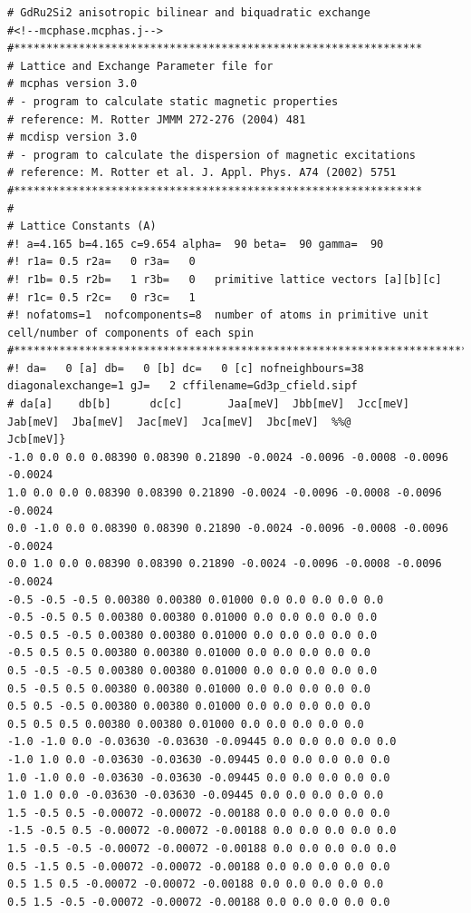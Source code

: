 {\footnotesize
\begin{verbatim}
# GdRu2Si2 anisotropic bilinear and biquadratic exchange 
#<!--mcphase.mcphas.j-->
#***************************************************************
# Lattice and Exchange Parameter file for
# mcphas version 3.0
# - program to calculate static magnetic properties
# reference: M. Rotter JMMM 272-276 (2004) 481
# mcdisp version 3.0
# - program to calculate the dispersion of magnetic excitations
# reference: M. Rotter et al. J. Appl. Phys. A74 (2002) 5751
#***************************************************************
#
# Lattice Constants (A)
#! a=4.165 b=4.165 c=9.654 alpha=  90 beta=  90 gamma=  90
#! r1a= 0.5 r2a=   0 r3a=   0
#! r1b= 0.5 r2b=   1 r3b=   0   primitive lattice vectors [a][b][c]
#! r1c= 0.5 r2c=   0 r3c=   1
#! nofatoms=1  nofcomponents=8  number of atoms in primitive unit cell/number of components of each spin
#****************************************************************************}
#! da=   0 [a] db=   0 [b] dc=   0 [c] nofneighbours=38 diagonalexchange=1 gJ=   2 cffilename=Gd3p_cfield.sipf
# da[a]    db[b]      dc[c]       Jaa[meV]  Jbb[meV]  Jcc[meV]  Jab[meV]  Jba[meV]  Jac[meV]  Jca[meV]  Jbc[meV]  %%@
Jcb[meV]} 
-1.0 0.0 0.0 0.08390 0.08390 0.21890 -0.0024 -0.0096 -0.0008 -0.0096 -0.0024 
1.0 0.0 0.0 0.08390 0.08390 0.21890 -0.0024 -0.0096 -0.0008 -0.0096 -0.0024 
0.0 -1.0 0.0 0.08390 0.08390 0.21890 -0.0024 -0.0096 -0.0008 -0.0096 -0.0024 
0.0 1.0 0.0 0.08390 0.08390 0.21890 -0.0024 -0.0096 -0.0008 -0.0096 -0.0024 
-0.5 -0.5 -0.5 0.00380 0.00380 0.01000 0.0 0.0 0.0 0.0 0.0 
-0.5 -0.5 0.5 0.00380 0.00380 0.01000 0.0 0.0 0.0 0.0 0.0 
-0.5 0.5 -0.5 0.00380 0.00380 0.01000 0.0 0.0 0.0 0.0 0.0 
-0.5 0.5 0.5 0.00380 0.00380 0.01000 0.0 0.0 0.0 0.0 0.0 
0.5 -0.5 -0.5 0.00380 0.00380 0.01000 0.0 0.0 0.0 0.0 0.0 
0.5 -0.5 0.5 0.00380 0.00380 0.01000 0.0 0.0 0.0 0.0 0.0 
0.5 0.5 -0.5 0.00380 0.00380 0.01000 0.0 0.0 0.0 0.0 0.0 
0.5 0.5 0.5 0.00380 0.00380 0.01000 0.0 0.0 0.0 0.0 0.0 
-1.0 -1.0 0.0 -0.03630 -0.03630 -0.09445 0.0 0.0 0.0 0.0 0.0 
-1.0 1.0 0.0 -0.03630 -0.03630 -0.09445 0.0 0.0 0.0 0.0 0.0 
1.0 -1.0 0.0 -0.03630 -0.03630 -0.09445 0.0 0.0 0.0 0.0 0.0 
1.0 1.0 0.0 -0.03630 -0.03630 -0.09445 0.0 0.0 0.0 0.0 0.0 
1.5 -0.5 0.5 -0.00072 -0.00072 -0.00188 0.0 0.0 0.0 0.0 0.0 
-1.5 -0.5 0.5 -0.00072 -0.00072 -0.00188 0.0 0.0 0.0 0.0 0.0 
1.5 -0.5 -0.5 -0.00072 -0.00072 -0.00188 0.0 0.0 0.0 0.0 0.0 
0.5 -1.5 0.5 -0.00072 -0.00072 -0.00188 0.0 0.0 0.0 0.0 0.0 
0.5 1.5 0.5 -0.00072 -0.00072 -0.00188 0.0 0.0 0.0 0.0 0.0 
0.5 1.5 -0.5 -0.00072 -0.00072 -0.00188 0.0 0.0 0.0 0.0 0.0 

\end{verbatim}}
